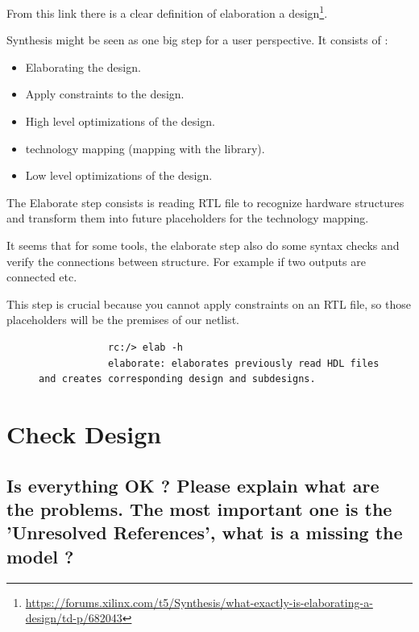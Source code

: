\documentclass[11pt,a4paper,sans,dvipsnames]{report}
\begin{document}
	From this link there is a clear definition of elaboration a design\footnote{\url{https://forums.xilinx.com/t5/Synthesis/what-exactly-is-elaborating-a-design/td-p/682043}}.

	Synthesis might be seen as one big step for a user perspective. It consists of :

	\begin{itemize}
		\item Elaborating the design.
		\item Apply constraints to the design.
		\item High level optimizations of the design.
		\item technology mapping (mapping with the library).
		\item Low level optimizations of the design.
	\end{itemize}

	\par The Elaborate step consists is reading RTL file to recognize hardware structures and transform them into future placeholders for the technology mapping. 
	\par It seems that for some tools, the elaborate step also do some syntax checks and verify the connections between structure. For example if two outputs are connected etc.
	\par This step is crucial because you cannot apply constraints on an RTL file, so those placeholders will be the premises of our netlist.


	\begin{figure}[h!]
		\centering
		\begin{lstlisting}
			rc:/> elab -h
			elaborate: elaborates previously read HDL files and creates corresponding design and subdesigns.
		\end{lstlisting}
		\label{fig:rc_elaborate}
	\end{figure}




	\newpage
	\section{Check Design}
	\subsection*{Is everything OK ? Please explain what are the problems. The most important one is the
		'Unresolved References', what is a missing the model ?}
\end{document}
